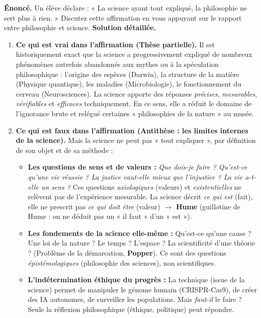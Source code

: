 \documentclass[11pt]{article}
\begin{document}
\begin{exoresolu}
\textbf{Énoncé.} Un élève déclare : « La science ayant tout expliqué, la philosophie ne sert plus à rien. » Discutez cette affirmation en vous appuyant sur le rapport entre philosophie et science.
\tcblower
\textbf{Solution détaillée.}

\begin{enumerate}
\item \textbf{Ce qui est vrai dans l'affirmation (Thèse partielle).} Il est historiquement exact que la science a progressivement expliqué de nombreux phénomènes autrefois abandonnés aux mythes ou à la spéculation philosophique : l'origine des espèces (Darwin), la structure de la matière (Physique quantique), les maladies (Microbiologie), le fonctionnement du cerveau (Neurosciences). La science apporte des réponses \emph{précises}, \emph{mesurables}, \emph{vérifiables} et \emph{efficaces} techniquement. En ce sens, elle a réduit le domaine de l'ignorance brute et relégué certaines « philosophies de la nature » au musée.
\item \textbf{Ce qui est faux dans l'affirmation (Antithèse : les limites internes de la science).} Mais la science ne peut pas « tout expliquer », par définition de son objet et de sa méthode :
    \begin{itemize}
    \item \textbf{Les questions de sens et de valeurs :} \emph{Que dois-je faire ? Qu'est-ce qu'une vie réussie ? La justice vaut-elle mieux que l'injustice ? La vie a-t-elle un sens ?} Ces questions \emph{axiologiques} (valeurs) et \emph{existentielles} ne relèvent pas de l'expérience mesurable. La science décrit \emph{ce qui est} (fait), elle ne prescrit pas \emph{ce qui doit être} (valeur) $\rightarrow$ \textbf{Hume} (guillotine de Hume : on ne déduit pas un « il faut » d'un « est »).
    \item \textbf{Les fondements de la science elle-même :} Qu'est-ce qu'une cause ? Une loi de la nature ? Le temps ? L'espace ? La scientificité d'une théorie ? (Problème de la démarcation, \textbf{Popper}). Ce sont des questions \emph{épistémologiques} (philosophie des sciences), non scientifiques.
    \item \textbf{L'indétermination éthique du progrès :} La technique (issue de la science) permet de manipuler le génome humain (CRISPR-Cas9), de créer des IA autonomes, de surveiller les populations. Mais \emph{faut-il} le faire ? Seule la réflexion philosophique (éthique, politique) peut répondre.

\end{itemize}
\end{enumerate}
\end{exoresolu}
\end{document}
